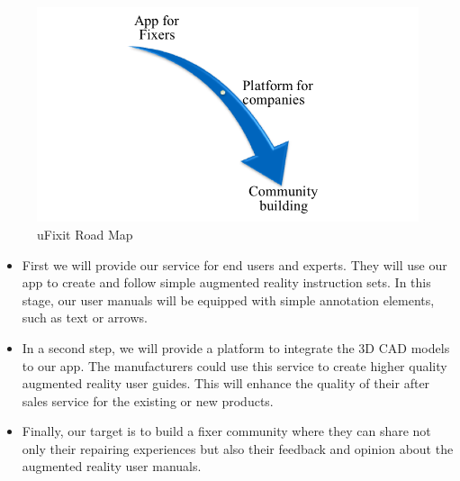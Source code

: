 \begin{figure}[H]
		\includegraphics[width=\textwidth]{../images/RoadMap.png}
		\centering
		\caption[uFixit Road Map]{uFixit Road Map}
		\label{fig:Road Map}
\end{figure}

\begin{itemize}
	\item First we will provide our service for end users and experts. They will use our app to create and follow simple augmented reality instruction sets. In this stage, our user manuals will be equipped with simple annotation elements, such as text or arrows.

	\item In a second step, we will provide a platform to integrate the 3D CAD models to our app. The manufacturers could use this service to create higher quality augmented reality user guides. This will enhance the quality of their after sales service for the existing or new products.
	
	\item Finally, our target is to build a fixer community where they can share not only their repairing experiences but also their feedback and opinion about the augmented reality user manuals. 
\end{itemize}

